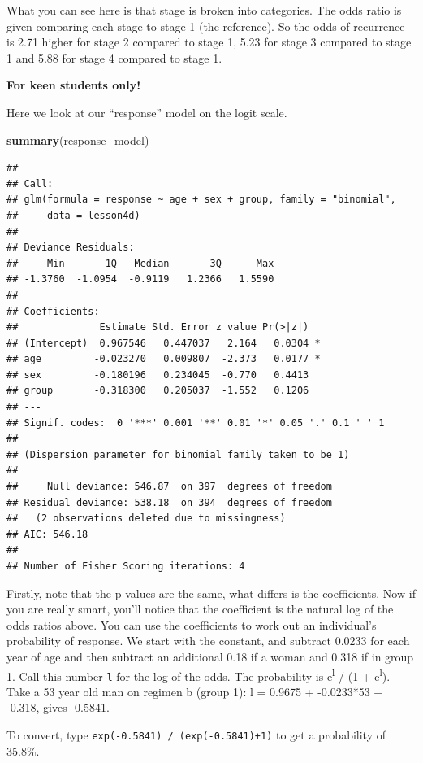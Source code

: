\documentclass[]{book}
\newenvironment{Shaded}{\begin{snugshade}}{\end{snugshade}}
\newcommand{\KeywordTok}[1]{\textcolor[rgb]{0.13,0.29,0.53}{\textbf{#1}}}
\newcommand{\NormalTok}[1]{#1}
\begin{document}
What you can see here is that stage is broken into categories. The odds ratio is given comparing each stage to stage 1 (the reference). So the odds of recurrence is 2.71 higher for stage 2 compared to stage 1, 5.23 for stage 3 compared to stage 1 and 5.88 for stage 4 compared to stage 1.

\textbf{For keen students only!}

Here we look at our ``response'' model on the logit scale.

\begin{Shaded}
\begin{Highlighting}[]
\KeywordTok{summary}\NormalTok{(response_model)}
\end{Highlighting}
\end{Shaded}

\begin{verbatim}
## 
## Call:
## glm(formula = response ~ age + sex + group, family = "binomial", 
##     data = lesson4d)
## 
## Deviance Residuals: 
##     Min       1Q   Median       3Q      Max  
## -1.3760  -1.0954  -0.9119   1.2366   1.5590  
## 
## Coefficients:
##              Estimate Std. Error z value Pr(>|z|)  
## (Intercept)  0.967546   0.447037   2.164   0.0304 *
## age         -0.023270   0.009807  -2.373   0.0177 *
## sex         -0.180196   0.234045  -0.770   0.4413  
## group       -0.318300   0.205037  -1.552   0.1206  
## ---
## Signif. codes:  0 '***' 0.001 '**' 0.01 '*' 0.05 '.' 0.1 ' ' 1
## 
## (Dispersion parameter for binomial family taken to be 1)
## 
##     Null deviance: 546.87  on 397  degrees of freedom
## Residual deviance: 538.18  on 394  degrees of freedom
##   (2 observations deleted due to missingness)
## AIC: 546.18
## 
## Number of Fisher Scoring iterations: 4
\end{verbatim}

Firstly, note that the p values are the same, what differs is the coefficients. Now if you are really smart, you'll notice that the coefficient is the natural log of the odds ratios above. You can use the coefficients to work out an individual's probability of response. We start with the constant, and subtract 0.0233 for each year of age and then subtract an additional 0.18 if a woman and 0.318 if in group 1. Call this number \texttt{l} for the log of the odds. The probability is e\textsuperscript{l} / (1 + e\textsuperscript{l}). Take a 53 year old man on regimen b (group 1): l = 0.9675 + -0.0233*53 + -0.318, gives -0.5841.

To convert, type \texttt{exp(-0.5841)\ /\ (exp(-0.5841)+1)} to get a probability of 35.8\%.
\end{document}
